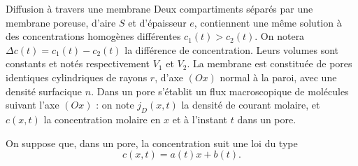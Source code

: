 \begin{exo}[PC][3][colle]{Diffusion à travers une membrane}
  Deux compartiments séparés par une membrane poreuse, d'aire $S$ et d'épaisseur $e$, contiennent une même solution à des concentrations homogènes différentes $c_{1}(t) > c_{2}(t)$. On notera $\Delta c (t)=c_{1}(t)-c_{2}(t)$ la différence de concentration. Leurs volumes sont constants et notés respectivement $V_{1}$ et $V_{2}$.  La membrane est constituée de pores identiques cylindriques de rayons $r$, d'axe  $(Ox)$ normal à la paroi, avec une densité surfacique $n$. Dans un pore s'établit un flux macroscopique de molécules suivant l'axe $(Ox)$ : on note $j_{D}(x,t)$ la densité de courant molaire, et $c(x, t)$ la concentration molaire en $x$ et à l'instant $t$ dans un pore.




  On suppose que, dans un pore, la concentration suit une loi du type
  \begin{equation}
    c(x, t)=a(t) x+b(t).
  \end{equation}


\end{exo}
